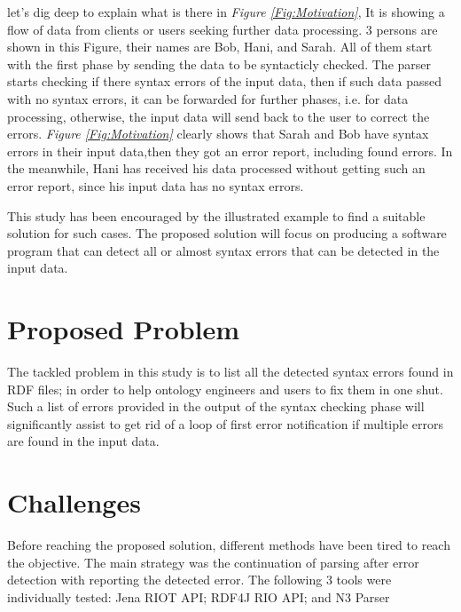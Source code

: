 	let's dig deep to explain what is there in  {\it Figure \ref{Fig:Motivation}}, It is showing a flow of data from clients or users seeking further data processing. 3 persons are shown in this Figure, their names are Bob, Hani, and Sarah. All of them start with the first phase by sending the data to be syntacticly checked. The parser starts checking if there syntax errors of the input data, then if such data passed with no syntax errors, it can be forwarded for further phases, i.e. for data processing, otherwise, the input data will send back to the user to correct the errors. {\it Figure \ref{Fig:Motivation}} clearly shows that Sarah and Bob have syntax errors in their input data,then they got an error report, including found errors. In the meanwhile, Hani has received his data processed without getting such an error report, since his input data has no syntax errors. 
			\par
			This study has been encouraged by the illustrated example to find a suitable solution for such cases. The proposed solution will focus on producing a software program that can detect all or almost syntax errors that can be detected in the input data. 

\section{Proposed Problem } 	
The tackled problem in this study is to list all the detected syntax errors found in RDF files; in order to help ontology engineers and users to fix them in one shut. Such a list of errors provided in the output of the syntax checking phase will significantly assist to get rid of a loop of first error notification if multiple errors are found in the input data.  

\section{Challenges }
Before reaching the proposed solution, different methods have been tired to reach the objective. The main strategy was the continuation of parsing after error detection with reporting the detected error. The following 3 tools were individually tested: Jena RIOT API; RDF4J RIO API; and  N3 Parser %


